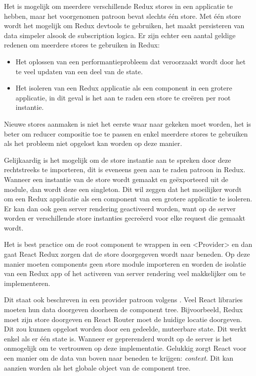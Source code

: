 Het is mogelijk om meerdere verschillende Redux stores in een applicatie te hebben, maar het voorgenomen patroon bevat slechts één store. Met één store wordt het mogelijk om Redux devtools te gebruiken, het maakt persisteren van data simpeler alsook de subscription logica. Er zijn echter een aantal geldige redenen om meerdere stores te gebruiken in Redux:
\begin{itemize}
	\item Het oplossen van een performantieprobleem dat veroorzaakt wordt door het te veel updaten van een deel van de state.
	\item Het isoleren van een Redux applicatie als een component in een grotere applicatie, in dit geval is het aan te raden een store te creëren per root instantie.
\end{itemize}
Nieuwe stores aanmaken is niet het eerste waar naar gekeken moet worden, het is beter om reducer compositie toe te passen en enkel meerdere stores te gebruiken als het probleem niet opgelost kan worden op deze manier.

Gelijkaardig is het mogelijk om de store instantie aan te spreken door deze rechtstreeks te importeren, dit is eveneens geen aan te raden patroon in Redux. Wanneer een instantie van de store wordt gemaakt en geëxporteerd uit de module, dan wordt deze een singleton. Dit wil zeggen dat het moeilijker wordt om een Redux applicatie als een component van een grotere applicatie te isoleren. Er kan dan ook geen server rendering geactiveerd worden, want op de server worden er verschillende store instanties gecreëerd voor elke request die gemaakt wordt.

Het is best practice om de root component te wrappen in een <Provider> en dan gaat React Redux zorgen dat de store doorgegeven wordt naar beneden. Op deze manier moeten components geen store module importeren en worden de isolatie van een Redux app of het activeren van server rendering veel makkelijker om te implementeren.
\autocite{Redux02}

Dit staat ook beschreven in een provider patroon volgens \textcite{provider}. Veel React libraries moeten hun data doorgeven doorheen de component tree. Bijvoorbeeld, Redux moet zijn store doorgeven en React Router moet de huidige locatie doorgeven. Dit zou kunnen opgelost worden door een gedeelde, muteerbare state. Dit werkt enkel als er één state is. Wanneer er geprerenderd wordt op de server is het onmogelijk om te vertrouwen op deze implementatie. Gelukkig zorgt React voor een manier om de data van boven naar beneden te krijgen: \textit{context}. Dit kan aanzien worden als het globale object van de component tree.

